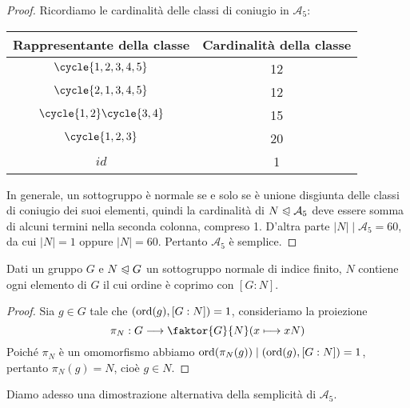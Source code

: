 \documentclass[11pt]{scrartcl}
\begin{document}
\begin{proof}
    Ricordiamo le cardinalità delle classi di coniugio in $\mathcal{A}_5$:


    \begingroup
    \renewcommand{\arraystretch}{1.5}
    \begin{center}
    \begin{tabular}{c|c}
        Rappresentante della classe & Cardinalità della classe\\
        \hline
        $\cycle{1, 2, 3, 4, 5}$ & 12\\
        $\cycle{2, 1, 3, 4, 5}$ & 12\\
        $\cycle{1, 2}\cycle{3, 4}$ & 15\\
        $\cycle{1, 2, 3}$ & 20\\
        $id$ & 1 
    \end{tabular}
    \end{center}
    \endgroup
    In generale, un sottogruppo è normale se e solo se è unione disgiunta
    delle classi di coniugio dei suoi elementi, quindi la cardinalità
    di $N \trianglelefteqslant \mathcal{A}_5$ deve essere somma di alcuni 
    termini nella seconda colonna, compreso 1. D'altra parte $|N| \mid \mathcal{A}_5 = 60$,
    da cui $|N| = 1$ oppure $|N| = 60$. Pertanto $\mathcal{A}_5$ è semplice.
\end{proof}

\begin{lemma}
    \label{lemma6.0}
    Dati un gruppo $G$ e $N\trianglelefteqslant G$ un sottogruppo normale di 
    indice finito, $N$ contiene ogni elemento di $G$ il cui ordine è coprimo
    con $[G:N]$.
\end{lemma}

\begin{proof}
    Sia $g \in G$ tale che $(\operatorname{ord}(g), [G:N]) = 1$, consideriamo la proiezione
    \[
        \pi_N:G \longrightarrow \faktor{G}{N} (x \longmapsto xN)
    \]
    Poiché $\pi_N$ è un omomorfismo abbiamo $\operatorname{ord}(\pi_N(g)) \mid (\operatorname{ord}(g), [G:N]) = 1$,
    pertanto $\pi_N(g) = N$, cioè $g \in N$.
\end{proof}

Diamo adesso una dimostrazione alternativa della semplicità di $\mathcal{A}_5$.
\end{document}
